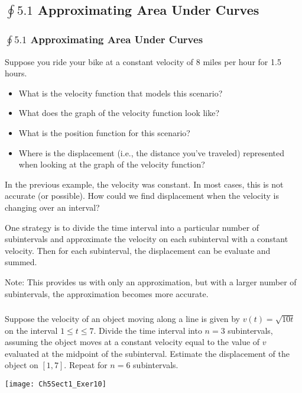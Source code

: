 \documentclass[14pt]{beamer}
\begin{document}
\begin{frame}
\subsection[$\oint 5.1$ Approximating Area Under Curves]{$\oint 5.1$ Approximating Area Under Curves}
\frametitle{$\oint 5.1$ Approximating Area Under Curves}
\small
\begin{ex} Suppose you ride your bike at a constant velocity of 8 miles per hour for 1.5 hours.
\begin{itemize}
\item What is the velocity function that models this scenario?
\item What does the graph of the velocity function look like?
\item What is the position function for this scenario?
\item Where is the displacement (i.e., the distance you've traveled) represented when looking at the graph of the velocity function?
\end{itemize}
\end{ex}
\end{frame}

\begin{frame}
\small
In the previous example, the velocity was constant.  In most cases, this is not accurate (or possible).  How could we find displacement when the velocity is changing over an interval?

\bigskip

One strategy is to divide the time interval into a particular number of subintervals and approximate the velocity on each subinterval with a constant velocity.  Then for each subinterval, the displacement can be evaluate and summed.

\bigskip

Note:  This provides us with only an approximation, but with a larger number of subintervals, the approximation becomes more accurate.
\end{frame}

\begin{frame}
\frametitle{}
\footnotesize
\begin{ex} Suppose the velocity of an object moving along a line is given by $v(t)=\sqrt{10t}$ on the interval $1 \le t \le 7$.  Divide the time interval into $n=3$ subintervals, assuming the object moves at a constant velocity equal to the value of $v$ evaluated at the midpoint of the subinterval.  Estimate the displacement of the object on $[1,7]$.  Repeat for $n=6$ subintervals. \end{ex}

\vspace{-0.5pc}
\begin{center}
\texttt{[image: Ch5Sect1\_Exer10]}
\end{center}
\end{frame}
\end{document}
